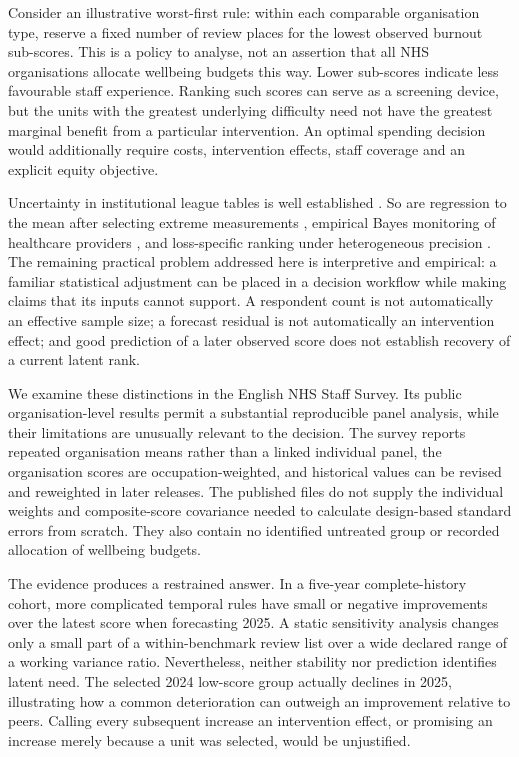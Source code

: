 \documentclass[11pt,letterpaper]{article}
\begin{document}
Consider an illustrative worst-first rule: within each comparable organisation type, reserve a fixed number of review places for the lowest observed burnout sub-scores. This is a policy to analyse, not an assertion that all NHS organisations allocate wellbeing budgets this way. Lower sub-scores indicate less favourable staff experience. Ranking such scores can serve as a screening device, but the units with the greatest underlying difficulty need not have the greatest marginal benefit from a particular intervention. An optimal spending decision would additionally require costs, intervention effects, staff coverage and an explicit equity objective.

Uncertainty in institutional league tables is well established \citep{goldstein1996league}. So are regression to the mean after selecting extreme measurements \citep{barnett2005rtm}, empirical Bayes monitoring of healthcare providers \citep{houwelingen2020monitoring}, and loss-specific ranking under heterogeneous precision \citep{lin2006ranking,gu2023invidious}. The remaining practical problem addressed here is interpretive and empirical: a familiar statistical adjustment can be placed in a decision workflow while making claims that its inputs cannot support. A respondent count is not automatically an effective sample size; a forecast residual is not automatically an intervention effect; and good prediction of a later observed score does not establish recovery of a current latent rank.

We examine these distinctions in the English NHS Staff Survey. Its public organisation-level results permit a substantial reproducible panel analysis, while their limitations are unusually relevant to the decision. The survey reports repeated organisation means rather than a linked individual panel, the organisation scores are occupation-weighted, and historical values can be revised and reweighted in later releases. The published files do not supply the individual weights and composite-score covariance needed to calculate design-based standard errors from scratch. They also contain no identified untreated group or recorded allocation of wellbeing budgets.

The evidence produces a restrained answer. In a five-year complete-history cohort, more complicated temporal rules have small or negative improvements over the latest score when forecasting 2025. A static sensitivity analysis changes only a small part of a within-benchmark review list over a wide declared range of a working variance ratio. Nevertheless, neither stability nor prediction identifies latent need. The selected 2024 low-score group actually declines in 2025, illustrating how a common deterioration can outweigh an improvement relative to peers. Calling every subsequent increase an intervention effect, or promising an increase merely because a unit was selected, would be unjustified.
\end{document}

